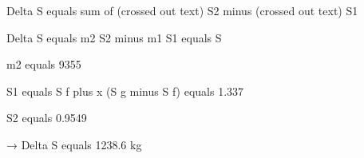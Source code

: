 Delta S equals sum of (crossed out text) S2 minus (crossed out text) S1

Delta S equals m2 S2 minus m1 S1 equals S

m2 equals 9355

S1 equals S f plus x (S g minus S f) equals 1.337

S2 equals 0.9549

→ Delta S equals 1238.6 kg